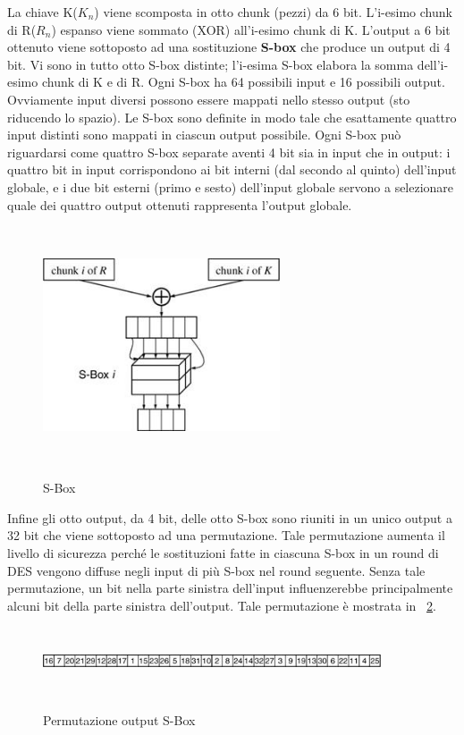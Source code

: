 La chiave K($K_{n}$) viene scomposta in otto chunk (pezzi) da 6 bit. L'i-esimo chunk di R($R_{n}$) espanso viene sommato (XOR) all'i-esimo chunk di K. L'output a 6 bit ottenuto viene sottoposto ad una sostituzione \textbf{S-box} che produce un output di 4 bit. Vi sono in tutto otto S-box distinte; l'i-esima S-box elabora la somma dell'i-esimo chunk di K e di R. Ogni S-box ha 64 possibili input e 16 possibili output. Ovviamente input diversi possono essere mappati nello stesso output (sto riducendo lo spazio). Le S-box sono definite in modo tale che esattamente quattro
input distinti sono mappati in ciascun output possibile. Ogni S-box può riguardarsi come quattro S-box separate aventi 4 bit sia in input che in output: i quattro bit in input corrispondono ai bit interni (dal secondo al quinto) dell'input globale, e i due bit esterni (primo e sesto) dell'input globale servono a selezionare quale dei quattro output ottenuti rappresenta l'output globale.
\begin{figure}[htbp]
	\centering%
	\subfigure%
	{\includegraphics[height=7cm, width=7cm, keepaspectratio]{Immagini/chiave_segreta/sbox.png}}
	\caption{S-Box \label{fig:sbox}} 	
\end{figure}
\newline

Infine gli otto output, da 4 bit, delle otto S-box sono riuniti in un unico output a 32 bit che viene sottoposto ad una permutazione. Tale permutazione aumenta il livello di sicurezza perché le sostituzioni fatte in ciascuna S-box in un round di DES vengono diffuse negli input di più S-box nel round seguente. Senza tale permutazione, un bit nella parte sinistra dell'input influenzerebbe principalmente alcuni bit della parte sinistra dell'output. Tale permutazione è mostrata in \figurename ~\ref{fig:sbox_perm}.
\begin{figure}[htbp]
	\centering%
	\subfigure%
	{\includegraphics[height=2cm, width=10cm, keepaspectratio]{Immagini/chiave_segreta/sbox_perm.png}}
	\caption{Permutazione output S-Box \label{fig:sbox_perm}} 	
\end{figure}
	
